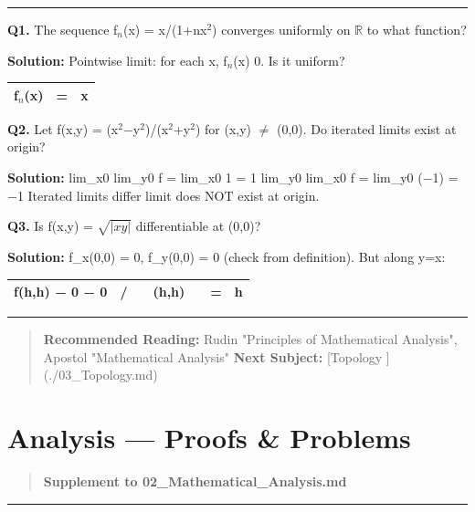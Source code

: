 \documentclass[12pt,a4paper,openany]{book}
\begin{document}
{{\bigskip\noindent\rule{\textwidth}{0.4pt}\bigskip


\textbf{Q1.} The sequence f$_n$(x) = x/(1+nx$^2$) converges uniformly on $\mathbb{R}$ to what function?

\textbf{Solution:} Pointwise limit: for each x, f$_n$(x)  0. Is it uniform?
\begin{center}
\begin{tabular}{|l|l|l|}
\hline
\textbf{f$_n$(x)} & \textbf{=} & \textbf{x} \\
\hline
\end{tabular}
\end{center}

\textbf{Q2.} Let f(x,y) = (x$^2$−y$^2$)/(x$^2$+y$^2$) for (x,y) $\neq$ (0,0). Do iterated limits exist at origin?

\textbf{Solution:} lim_{x0} lim_{y0} f = lim_{x0} 1 = 1
lim_{y0} lim_{x0} f = lim_{y0} (−1) = −1
Iterated limits differ  limit does NOT exist at origin.

\textbf{Q3.} Is f(x,y) = $\sqrt{|xy|}$ differentiable at (0,0)?

\textbf{Solution:} f_x(0,0) = 0, f_y(0,0) = 0 (check from definition). But along y=x:
\begin{center}
\begin{tabular}{|l|l|l|l|l|l|l|}
\hline
\textbf{f(h,h) − 0 − 0} & \textbf{/} & \textbf{} & \textbf{(h,h)} & \textbf{} & \textbf{=} & \textbf{h} \\
\hline
\end{tabular}
\end{center}

\bigskip\noindent\rule{\textwidth}{0.4pt}\bigskip

\begin{quote}
\textbf{ Recommended Reading:} Rudin "Principles of Mathematical Analysis", Apostol "Mathematical Analysis"
\textbf{Next Subject:} [Topology ](./03_Topology.md)
\end{quote}

\newpage

\chapter{Analysis --- Proofs \& Problems}


\begin{quote}
\textbf{Supplement to 02_Mathematical_Analysis.md}
\end{quote}

\bigskip\noindent\rule{\textwidth}{0.4pt}\bigskip


}}
\end{document}
